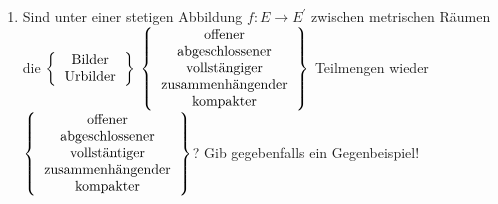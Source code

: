 \documentclass[11pt]{article}
\begin{document}
\begin{enumerate}
    \item Sind unter einer stetigen Abbildung $f: E \to E^\prime$ zwischen metrischen Räumen die $\left\{\begin{tabular}{c}
        \text{Bilder}\\
        \text{Urbilder}
    \end{tabular}\right\}$ $\left\{\begin{tabular}{c}
    \text{offener}\\
    \text{abgeschlossener}\\
    \text{vollstängiger}\\
    \text{zusammenhängender}\\
    \text{kompakter}
    \end{tabular}\right\}$ Teilmengen wieder $\left\{\begin{tabular}{c}
        \text{offener}\\
        \text{abgeschlossener}\\
        \text{vollstäntiger}\\
        \text{zusammenhängender}\\
        \text{kompakter}
        \end{tabular}\right\}$?
    Gib gegebenfalls ein Gegenbeispiel!


\end{enumerate}
\end{document}
